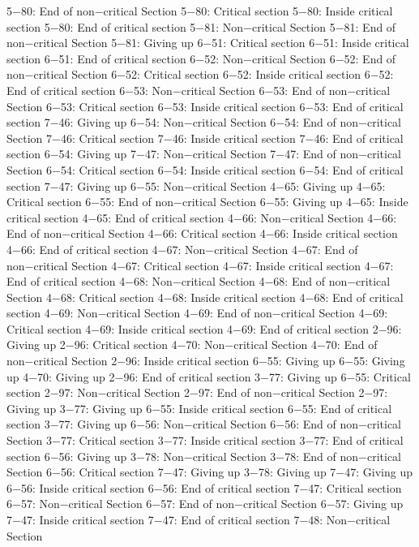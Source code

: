 5−80: End of non−critical Section
5−80: Critical section
5−80: Inside critical section
5−80: End of critical section
5−81: Non−critical Section
5−81: End of non−critical Section
5−81: Giving up
6−51: Critical section
6−51: Inside critical section
6−51: End of critical section
6−52: Non−critical Section
6−52: End of non−critical Section
6−52: Critical section
6−52: Inside critical section
6−52: End of critical section
6−53: Non−critical Section
6−53: End of non−critical Section
6−53: Critical section
6−53: Inside critical section
6−53: End of critical section
7−46: Giving up
6−54: Non−critical Section
6−54: End of non−critical Section
7−46: Critical section
7−46: Inside critical section
7−46: End of critical section
6−54: Giving up
7−47: Non−critical Section
7−47: End of non−critical Section
6−54: Critical section
6−54: Inside critical section
6−54: End of critical section
7−47: Giving up
6−55: Non−critical Section
4−65: Giving up
4−65: Critical section
6−55: End of non−critical Section
6−55: Giving up
4−65: Inside critical section
4−65: End of critical section
4−66: Non−critical Section
4−66: End of non−critical Section
4−66: Critical section
4−66: Inside critical section
4−66: End of critical section
4−67: Non−critical Section
4−67: End of non−critical Section
4−67: Critical section
4−67: Inside critical section
4−67: End of critical section
4−68: Non−critical Section
4−68: End of non−critical Section
4−68: Critical section
4−68: Inside critical section
4−68: End of critical section
4−69: Non−critical Section
4−69: End of non−critical Section
4−69: Critical section
4−69: Inside critical section
4−69: End of critical section
2−96: Giving up
2−96: Critical section
4−70: Non−critical Section
4−70: End of non−critical Section
2−96: Inside critical section
6−55: Giving up
6−55: Giving up
4−70: Giving up
2−96: End of critical section
3−77: Giving up
6−55: Critical section
2−97: Non−critical Section
2−97: End of non−critical Section
2−97: Giving up
3−77: Giving up
6−55: Inside critical section
6−55: End of critical section
3−77: Giving up
6−56: Non−critical Section
6−56: End of non−critical Section
3−77: Critical section
3−77: Inside critical section
3−77: End of critical section
6−56: Giving up
3−78: Non−critical Section
3−78: End of non−critical Section
6−56: Critical section
7−47: Giving up
3−78: Giving up
7−47: Giving up
6−56: Inside critical section
6−56: End of critical section
7−47: Critical section
6−57: Non−critical Section
6−57: End of non−critical Section
6−57: Giving up
7−47: Inside critical section
7−47: End of critical section
7−48: Non−critical Section
